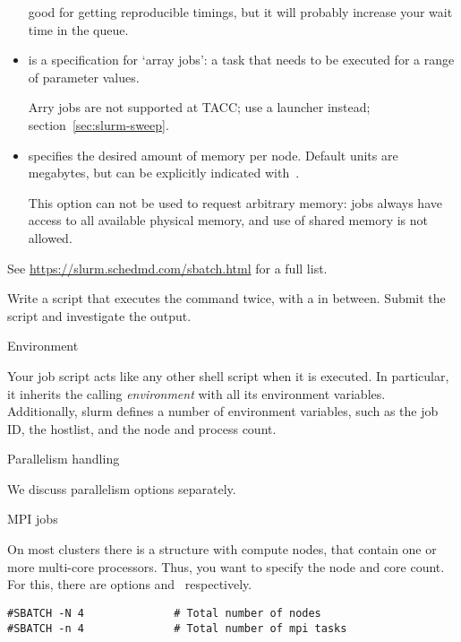 \begin{itemize}
  good for getting reproducible timings, but it will probably increase
  your wait time in the queue.
\item {} is a specification for `array jobs': a task that needs
  to be executed for a range of parameter values.
  \begin{taccnote}
  Arry jobs are not supported at TACC; use a launcher instead;
  section~\ref{sec:slurm-sweep}.
  \end{taccnote}
\item {} specifies the desired amount of memory per node.
  Default units are megabytes, but can be explicitly indicated
  with~.
  \begin{taccnote}
    This option can not be used to request arbitrary memory:
    jobs always have access to all available physical memory,
    and use of shared memory is not allowed.
  \end{taccnote}
\end{itemize}
See \url{https://slurm.schedmd.com/sbatch.html} for a full list.

\begin{exercise}
  Write a script that executes the  command twice,
  with a  in between.
  Submit the script and investigate the output.
\end{exercise}

 {Environment}

Your job script acts like any other shell script when it is executed.
In particular, it inherits the calling
\emph{environment}
with all its environment variables.
Additionally, slurm defines a number of environment variables,
such as the job ID, the hostlist, and the node and process count.

 {Parallelism handling}

We discuss parallelism options separately.

 {MPI jobs}

On most clusters there is a structure with compute nodes,
that contain one or more multi-core processors.
Thus, you want to specify the node and core count.
For this, there are options  and~ respectively.

\begin{verbatim}
#SBATCH -N 4              # Total number of nodes
#SBATCH -n 4              # Total number of mpi tasks
\end{verbatim}

